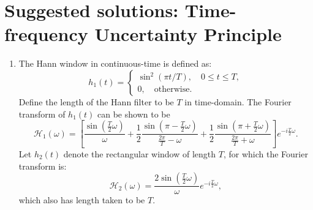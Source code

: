 \newpage
\section{Suggested solutions: Time-frequency Uncertainty Principle}

\begin{enumerate}
\item The Hann window in continuous-time is defined as:
$$h_{1}(t)=\begin{cases}
    \sin^{2}(\pi t/T), \quad 0\le t\le T, \\
    0, \quad \text{otherwise}.
\end{cases}$$
Define the length of the Hann filter to be $T$ in time-domain. The Fourier transform of $h_{1}(t)$ can be shown to be
$$\mathcal{H}_{1}(\omega)=\left[\frac{\sin(\frac{T}{2}\omega)}{\omega}+\frac{1}{2}\frac{\sin(\pi-\frac{T}{2}\omega)}{\frac{2\pi}{T}-\omega}+\frac{1}{2}\frac{\sin(\pi+\frac{T}{2}\omega)}{\frac{2\pi}{T}+\omega}\right]e^{-i\frac{T}{2}\omega}.$$
Let $h_{2}(t)$ denote the rectangular window of length $T$, for which the Fourier transform is:
$$\mathcal{H}_{2}(\omega)=\frac{2\sin(\frac{T}{2}\omega)}{\omega}e^{-i\frac{T}{2}\omega},$$
which also has length taken to be $T$. 


\end{enumerate}
